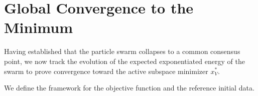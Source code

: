 \documentclass[12pt]{amsart}
\numberwithin{equation}{section}
\begin{document}
\section{Global Convergence to the Minimum}\label{sec:global_convergence}

Having established that the particle swarm collapses to a common consensus point, we now track the evolution of the expected exponentiated energy of the swarm to prove convergence toward the active subspace minimizer $x_V^*$. 





 We define the framework for the objective function and the reference initial data.%
\end{document}
